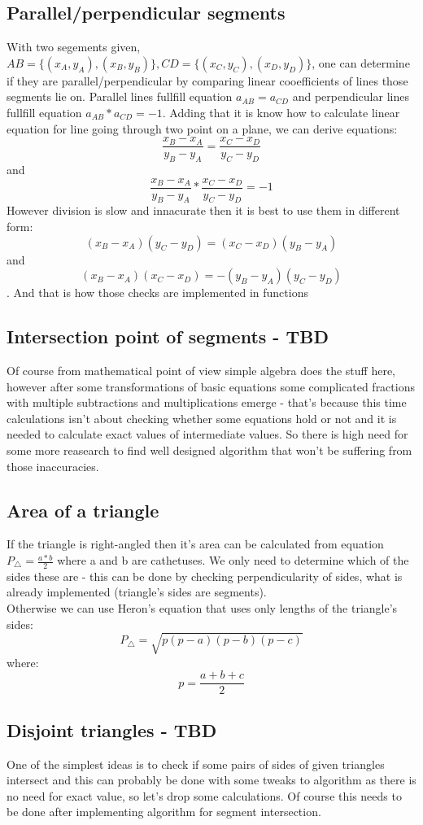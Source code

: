 \documentclass{article}
\begin{document}
\subsection{Parallel/perpendicular segments}
With two segements given, $AB = \{(x_A,y_A),(x_B,y_B)\}, CD = \{(x_C,y_C),(x_D,y_D)\} $, one can determine if they are parallel/perpendicular by comparing linear cooefficients of lines those segments lie on.
Parallel lines fullfill equation $ a_{AB} = a_{CD} $ and perpendicular lines fullfill equation $ a_{AB} * a_{CD} = -1 $. Adding that it is know how to calculate linear equation for line going through two point on a plane, we can derive equations:
$$ \frac{x_B-x_A}{y_B-y_A} = \frac{x_C - x_D}{y_C-y_D} $$
and
$$ \frac{x_B-x_A}{y_B-y_A}*\frac{x_C - x_D}{y_C-y_D} = -1 $$
However division is slow and innacurate then it is best to use them in different form:
$$ (x_B-x_A)(y_C-y_D) = (x_C - x_D)(y_B-y_A) $$
and
$$ (x_B-x_A)(x_C - x_D) = -(y_B-y_A)(y_C-y_D) $$.
And that is how those checks are implemented in functions
\subsection{Intersection point of segments - TBD}
Of course from mathematical point of view simple algebra does the stuff here, however after some transformations of basic equations  some complicated fractions with multiple subtractions and multiplications emerge - that's because this time calculations isn't about checking whether some equations hold or not and it is needed to calculate exact values of intermediate values. So there is high need for some more reasearch to find well designed algorithm that won't be suffering from those inaccuracies.
\subsection{Area of a triangle}
If the triangle is right-angled then it's area can be calculated from equation $ P_\triangle = \frac{a*b}{2}$ where a and b are cathetuses. We only need to determine which of the sides these are - this can be done by checking perpendicularity of sides, what is already implemented (triangle's sides are segments).\\
Otherwise we can use Heron's equation that uses only lengths of the triangle's sides:
$$ P_\triangle = \sqrt{p(p-a)(p-b)(p-c)} $$
where:
$$ p = \frac{a+b+c}{2} $$
\subsection{Disjoint triangles - TBD}
One of the simplest ideas is to check if some pairs of sides of given triangles intersect and this can probably be done with some tweaks to algorithm as there is no need for exact value, so let's drop some calculations. Of course this needs to be done after implementing algorithm for segment intersection.
\end{document}

